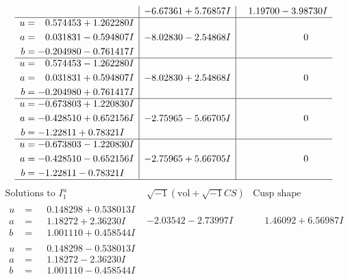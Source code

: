 \documentclass[1p]{elsarticle_modified}
\theoremstyle{definition}
\newcommand{\I}{\sqrt{-1}}
\begin{document}
$$\begin{array}{c|c|c}
 & -6.67361 + 5.76857 I & \phantom{-}1.19700 - 3.98730 I \\ \hline\begin{aligned}
u &= \phantom{-}0.574453 + 1.262280 I \\
a &= \phantom{-}0.031831 - 0.594807 I \\
b &= -0.204980 - 0.761417 I\end{aligned}
 & -8.02830 - 2.54868 I & \phantom{-0.000000 } 0 \\ \hline\begin{aligned}
u &= \phantom{-}0.574453 - 1.262280 I \\
a &= \phantom{-}0.031831 + 0.594807 I \\
b &= -0.204980 + 0.761417 I\end{aligned}
 & -8.02830 + 2.54868 I & \phantom{-0.000000 } 0 \\ \hline\begin{aligned}
u &= -0.673803 + 1.220830 I \\
a &= -0.428510 + 0.652156 I \\
b &= -1.22811 + 0.78321 I\end{aligned}
 & -2.75965 - 5.66705 I & \phantom{-0.000000 } 0 \\ \hline\begin{aligned}
u &= -0.673803 - 1.220830 I \\
a &= -0.428510 - 0.652156 I \\
b &= -1.22811 - 0.78321 I\end{aligned}
 & -2.75965 + 5.66705 I & \phantom{-0.000000 } 0\\
 \hline 
 \end{array}$$\newpage$$\begin{array}{c|c|c}  
\text{Solutions to }I^u_{1}& \I (\text{vol} + \sqrt{-1}CS) & \text{Cusp shape}\\
 \hline 
\begin{aligned}
u &= \phantom{-}0.148298 + 0.538013 I \\
a &= \phantom{-}1.18272 + 2.36230 I \\
b &= \phantom{-}1.001110 + 0.458544 I\end{aligned}
 & -2.03542 - 2.73997 I & \phantom{-}1.46092 + 6.56987 I \\ \hline\begin{aligned}
u &= \phantom{-}0.148298 - 0.538013 I \\
a &= \phantom{-}1.18272 - 2.36230 I \\
b &= \phantom{-}1.001110 - 0.458544 I\end{aligned}

\end{array}$$
\end{document}
